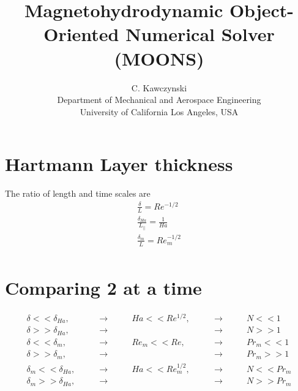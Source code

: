 \documentclass[11pt]{article}
\newcommand{\RA}{\rightarrow}
\begin{document}
\doublespacing
\title{Magnetohydrodynamic Object-Oriented Numerical Solver (MOONS)}
\author{C. Kawczynski \\
Department of Mechanical and Aerospace Engineering \\
University of California Los Angeles, USA\\
}
\maketitle

\section{Hartmann Layer thickness}
The ratio of length and time scales are
\begin{equation}\begin{aligned}
	\frac{\delta}{L} = Re^{-1/2} \\
	\frac{\delta_{Ha}}{L_{||}} = \frac{1}{Ha} \\
	\frac{\delta_m}{L} = Re_m^{-1/2} \\
\end{aligned}\end{equation}

\section{Comparing 2 at a time}
\begin{equation}\begin{aligned}
	\delta   <<  \delta_{Ha}, & \qquad \RA \qquad & Ha   << Re^{1/2}  , \qquad & \RA \qquad & N   << 1    \\
	\delta   >>  \delta_{Ha}, & \qquad \RA \qquad &                            & \RA \qquad & N   >> 1    \\
	\delta   <<  \delta_m   , & \qquad \RA \qquad & Re_m << Re        , \qquad & \RA \qquad & Pr_m<< 1    \\
	\delta   >>  \delta_m   , & \qquad \RA \qquad &                            & \RA \qquad & Pr_m>> 1    \\
	\delta_m <<  \delta_{Ha}, & \qquad \RA \qquad & Ha   << Re_m^{1/2}, \qquad & \RA \qquad & N   << Pr_m \\
	\delta_m >>  \delta_{Ha}, & \qquad \RA \qquad &                            & \RA \qquad & N   >> Pr_m \\
\end{aligned}\end{equation}
\end{document}
